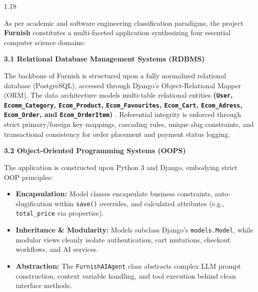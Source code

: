 \documentclass[12pt,a4paper]{article}
\begin{document}
{\fontsize{13.5}{19}\selectfont
\begin{spacing}{1.18}

\noindent
As per academic and software engineering classification paradigms, the project \textbf{Furnish} constitutes a multi-faceted application synthesizing four essential computer science domains:

\vspace{0.12in}

\noindent
\textbf{3.1 Relational Database Management Systems (RDBMS)}

\vspace{0.04in}

\noindent
The backbone of Furnish is structured upon a fully normalized relational database (PostgreSQL), accessed through Django's Object-Relational Mapper (ORM). The data architecture models multi-table relational entities \textbf{(\texttt{User}, \texttt{Ecomm\_Category}, \texttt{Ecom\_Product}, \texttt{Ecom\_Favourites}, \texttt{Ecom\_Cart}, \texttt{Ecom\_Adress}, \texttt{Ecom\_Order}, and \texttt{Ecom\_OrderItem})} . Referential integrity is enforced through strict primary/foreign key mappings, cascading rules, unique slug constraints, and transactional consistency for order placement and payment status logging.

\vspace{0.4in}

\noindent
\textbf{3.2 Object-Oriented Programming Systems (OOPS)}

\vspace{0.04in}

\noindent
The application is constructed upon Python 3 and Django, embodying strict OOP principles:
\begin{itemize}
    \setlength{\itemsep}{2pt}
    \setlength{\parskip}{0pt}
    \item \textbf{Encapsulation:} Model classes encapsulate business constraints, auto-slugification within \texttt{save()} overrides, and calculated attributes (e.g., \texttt{total\_price} via properties).
    \item \textbf{Inheritance \& Modularity:} Models subclass Django's \texttt{models.Model}, while modular views cleanly isolate authentication, cart mutations, checkout workflows, and AI services.
    \item \textbf{Abstraction:} The \texttt{FurnishAIAgent} class abstracts complex LLM prompt construction, context variable handling, and tool execution behind clean interface methods.
\end{itemize}


\end{spacing}}
\end{document}
